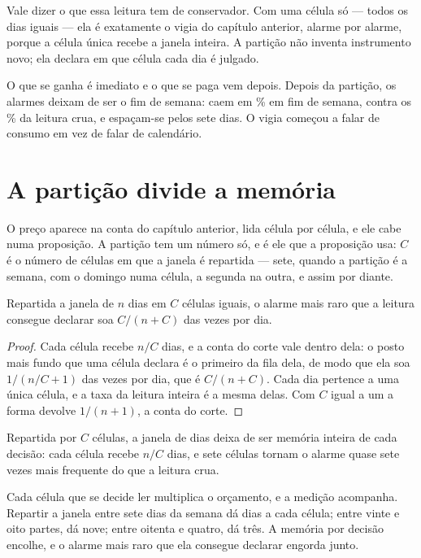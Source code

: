 Vale dizer o que essa leitura tem de conservador. Com uma célula só --- todos os dias iguais
--- ela é exatamente o vigia do capítulo anterior, alarme por alarme, porque a célula única
recebe a janela inteira. A partição não inventa instrumento novo; ela declara em que célula
cada dia é julgado.

O que se ganha é imediato e o que se paga vem depois. Depois da partição, os alarmes deixam de
ser o fim de semana: caem em \numCalendarioSemanaFimDeSemanaPct\% em fim de semana, contra os
\numCalendarioCruFimDeSemanaPct\% da leitura crua, e espaçam-se pelos sete dias. O vigia
começou a falar de consumo em vez de falar de calendário.

\section{A partição divide a memória}

O preço aparece na conta do capítulo anterior, lida célula por célula, e ele cabe numa
proposição.
A partição tem um número só, e é ele que a proposição usa: $C$ é o número de células em que a
janela é repartida --- sete, quando a partição é a semana, com o domingo numa célula, a segunda
na outra, e assim por diante.

\begin{proposicao}\label{prop:particao}
Repartida a janela de $n$ dias em $C$ células iguais, o alarme mais raro que a leitura consegue
declarar soa $C/(n+C)$ das vezes por dia.
\end{proposicao}

\begin{proof}
Cada célula recebe $n/C$ dias, e a conta do corte vale dentro dela: o posto mais fundo que uma
célula declara é o primeiro da fila dela, de modo que ela soa $1/(n/C + 1)$ das vezes por dia, que
é $C/(n+C)$. Cada dia pertence a uma única célula, e a taxa da leitura inteira é a mesma delas.
Com $C$ igual a um a forma devolve $1/(n+1)$, a conta do corte.
\end{proof}

Repartida por $C$ células, a janela de \numCalendarioJanela{} dias deixa de ser memória inteira de
cada decisão: cada célula recebe $n/C$ dias, e sete células tornam o alarme quase sete vezes mais
frequente do que a leitura crua.

Cada célula que se decide ler multiplica o orçamento, e a medição acompanha. Repartir a janela
entre sete dias da semana dá 
\numCalendarioSemanaDiasPorCelula{} dias a cada célula; entre vinte
e oito partes, dá nove; entre oitenta e quatro, dá três. A memória por decisão encolhe, e o
alarme mais raro que ela consegue declarar engorda junto.

